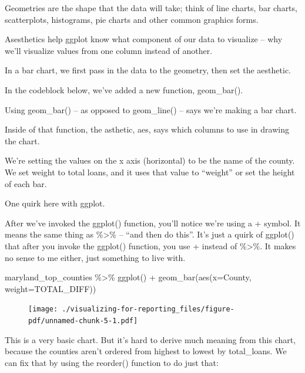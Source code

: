 \documentclass[
  letterpaper,
  DIV=11,
  numbers=noendperiod]{scrreprt}
\newenvironment{Shaded}{\begin{snugshade}}{\end{snugshade}}
\newcommand{\AttributeTok}[1]{\textcolor[rgb]{0.40,0.45,0.13}{#1}}
\newcommand{\FunctionTok}[1]{\textcolor[rgb]{0.28,0.35,0.67}{#1}}
\newcommand{\NormalTok}[1]{\textcolor[rgb]{0.00,0.23,0.31}{#1}}
\newcommand{\SpecialCharTok}[1]{\textcolor[rgb]{0.37,0.37,0.37}{#1}}
\begin{document}
Geometries are the shape that the data will take; think of line charts,
bar charts, scatterplots, histograms, pie charts and other common
graphics forms.

Asesthetics help ggplot know what component of our data to visualize --
why we'll visualize values from one column instead of another.

In a bar chart, we first pass in the data to the geometry, then set the
aesthetic.

In the codeblock below, we've added a new function, geom\_bar().

Using geom\_bar() -- as opposed to geom\_line() -- says we're making a
bar chart.

Inside of that function, the asthetic, aes, says which columns to use in
drawing the chart.

We're setting the values on the x axis (horizontal) to be the name of
the county. We set weight to total loans, and it uses that value to
``weight'' or set the height of each bar.

One quirk here with ggplot.

After we've invoked the ggplot() function, you'll notice we're using a +
symbol. It means the same thing as \%\textgreater\% -- ``and then do
this''. It's just a quirk of ggplot() that after you invoke the ggplot()
function, you use + instead of \%\textgreater\%. It makes no sense to me
either, just something to live with.

\begin{Shaded}
\begin{Highlighting}[]
\NormalTok{maryland\_top\_counties }\SpecialCharTok{\%\textgreater{}\%}
  \FunctionTok{ggplot}\NormalTok{() }\SpecialCharTok{+}
  \FunctionTok{geom\_bar}\NormalTok{(}\FunctionTok{aes}\NormalTok{(}\AttributeTok{x=}\NormalTok{County, }\AttributeTok{weight=}\NormalTok{TOTAL\_DIFF))}
\end{Highlighting}
\end{Shaded}

\begin{figure}[H]

{\centering \texttt{[image: ./visualizing-for-reporting\_files/figure-pdf/unnamed-chunk-5-1.pdf]}

}

\end{figure}

This is a very basic chart. But it's hard to derive much meaning from
this chart, because the counties aren't ordered from highest to lowest
by total\_loans. We can fix that by using the reorder() function to do
just that:
\end{document}
